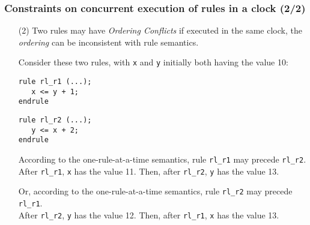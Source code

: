 
\begin{frame}[fragile]
\frametitle{Constraints on concurrent execution of rules in a clock (2/2)}

\footnotesize

\begin{itemize}

 \item[(2)] Two rules may have \emph{Ordering Conflicts} if executed
       in the same clock, {\ie} the \emph{ordering} can be
       inconsistent with rule semantics.

       \vspace{1ex}

       Consider these two rules, with {\tt x} and {\tt y} initially both having the value 10:

       \begin{center}
       \begin{minipage}{0.4\textwidth}
        {\footnotesize
        \begin{Verbatim}[frame=single]
rule rl_r1 (...);
   x <= y + 1;
endrule
        \end{Verbatim}
        }
       \end{minipage}
       \hmm
       \begin{minipage}{0.4\textwidth}
        {\footnotesize
        \begin{Verbatim}[frame=single]
rule rl_r2 (...);
   y <= x + 2;
endrule
        \end{Verbatim}
        }
       \end{minipage}
       \end{center}

       \vspace{1ex}

       According to the one-rule-at-a-time semantics,
       rule \verb|rl_r1| may precede \verb|rl_r2|. \\
       After \verb|rl_r1|, {\tt x} has the value 11.
       Then, after \verb|rl_r2|, {\tt y} has the value 13.

       \vspace{1ex}

       Or, according to the one-rule-at-a-time semantics,
       rule \verb|rl_r2| may precede \verb|rl_r1|. \\
       After \verb|rl_r2|, {\tt y} has the value 12.
       Then, after \verb|rl_r1|, {\tt x} has the value 13.


\end{itemize}
\end{frame}
